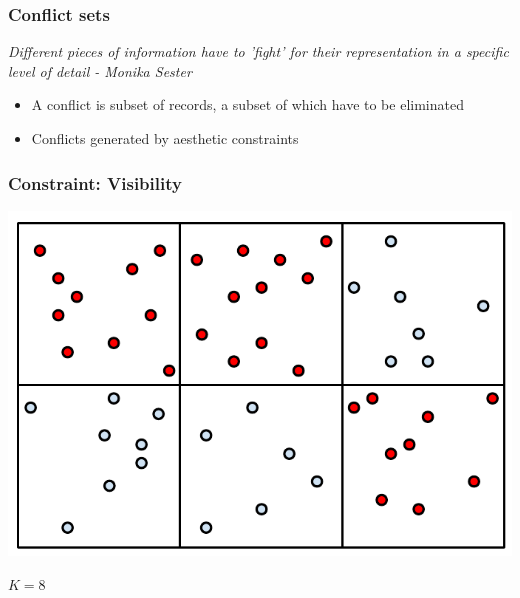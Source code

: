 \documentclass{beamer}
\begin{document}
\frame
{
  \frametitle{Conflict sets}
  \emph{Different pieces of information have to '{fight}' for their representation in a specific level of detail - Monika Sester}
  
  \begin{center}
  	 
  \end{center}
  
  \begin{itemize}
  \item A conflict is subset of records, a subset of which have to be eliminated
  \item Conflicts generated by aesthetic constraints
  \end{itemize}
}



\frame
{
  \frametitle{Constraint: Visibility}
  \begin{center}
  	\includegraphics[scale=0.8]{figs/cvl-visibility.pdf}
  \end{center}
  $K=8$
  
 
}
\end{document}
